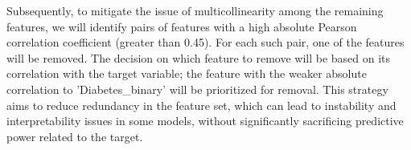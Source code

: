 Subsequently, to mitigate the issue of multicollinearity among the remaining features, we will identify pairs of features with a high absolute Pearson correlation coefficient (greater than 0.45). For each such pair, one of the features will be removed. The decision on which feature to remove will be based on its correlation with the target variable; the feature with the weaker absolute correlation to 'Diabetes_binary' will be prioritized for removal. This strategy aims to reduce redundancy in the feature set, which can lead to instability and interpretability issues in some models, without significantly sacrificing predictive power related to the target.
